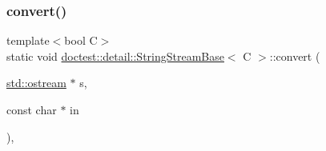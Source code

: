 \mbox{\label{structdoctest_1_1detail_1_1_string_stream_base_a7c248639907b26e46344b91d7ab90be7}} 
\subsubsection{\texorpdfstring{convert()}{convert()}\hspace{0.1cm}{\footnotesize\ttfamily [2/2]}}
{\footnotesize\ttfamily template$<$bool C$>$ \\
static void \hyperlink{structdoctest_1_1detail_1_1_string_stream_base}{doctest\+::detail\+::\+String\+Stream\+Base}$<$ C $>$\+::convert (\begin{DoxyParamCaption}\item[{\hyperlink{doctest_8h_a116af65cb5e924b33ad9d9ecd7a783f3}{std\+::ostream} $\ast$}]{s,  }\item[{const char $\ast$}]{in }\end{DoxyParamCaption})\hspace{0.3cm}{\ttfamily [inline]}, {\ttfamily [static]}}

